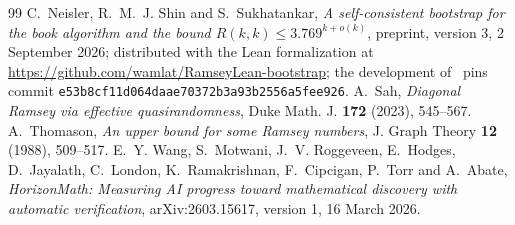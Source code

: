 \documentclass[11pt]{article}
\theoremstyle{definition}
\theoremstyle{remark}
\numberwithin{equation}{section}
\begin{document}
\begin{thebibliography}{99}
C.~Neisler, R.~M.~J. Shin and S.~Sukhatankar,
\emph{A self-consistent bootstrap for the book algorithm and the bound
$R(k,k)\le3.769^{k+o(k)}$},
preprint, version 3, 2 September 2026; distributed with the Lean
formalization at \url{https://github.com/wamlat/RamseyLean-bootstrap};
the development of~\cite{Artifact} pins commit
\texttt{e53b8cf11d064daae70372b3a93b2556a5fee926}.
A.~Sah,
\emph{Diagonal Ramsey via effective quasirandomness},
Duke Math. J. \textbf{172} (2023), 545--567.
A.~Thomason,
\emph{An upper bound for some Ramsey numbers},
J. Graph Theory \textbf{12} (1988), 509--517.
E.~Y. Wang, S.~Motwani, J.~V. Roggeveen, E.~Hodges, D.~Jayalath,
C.~London, K.~Ramakrishnan, F.~Cipcigan, P.~Torr and A.~Abate,
\emph{HorizonMath: Measuring AI progress toward mathematical discovery
with automatic verification},
arXiv:2603.15617, version 1, 16 March 2026.
\end{thebibliography}
\end{document}
